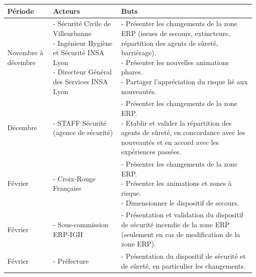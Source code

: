 \documentclass[hidelinks, paper=a4, fontsize=13pt]{report}
\begin{document}
\begin{center}
\begin{tabular}{| p{2cm} | p{5.5cm} | p{8cm} |}
\shrinkheight{1cm} 

  \hline
  \cellcolor[gray]{0.9} \textbf{Période} & \cellcolor[gray]{0.9} \textbf{Acteurs} & \cellcolor[gray]{0.9} \textbf{Buts} \\
  \hline
\vspace{0.1cm}
  Novembre à décembre & 
  \parbox[t]{5.5cm}{- Sécurité Civile de Villeurbanne\\
  - Ingénieur Hygiène et Sécurité INSA Lyon\\
  - Directeur Général des Services INSA Lyon} & 
  \parbox[t]{8cm}{- Présenter les changements de la zone ERP (issues de secours, extincteurs, répartition des agents de sûreté, barriérage).\\
  - Présenter les nouvelles animations phares.\\
  - Partager l'appréciation du risque lié aux nouveautés.}
\vspace{0.1cm}
 \\
 \hline
\vspace{0.1cm}
  Décembre &
  \parbox[t]{5.5cm}{- STAFF Sécurité (agence de sécurité)} & 
  \parbox[t]{8cm}{- Présenter les changements de la zone ERP.\\
  - Etablir et valider la répartition des agents de sûreté, en concordance avec les nouveautés et en accord avec les expériences passées.}
\vspace{0.1cm}
 \\
 \hline
\vspace{0.1cm}
  Février &
  \parbox[t]{5.5cm}{- Croix-Rouge Française} & 
  \parbox[t]{8cm}{- Présenter les changements de la zone ERP.\\
  - Présenter les animations et zones à risque.\\
  - Dimensionner le dispositif de secours.}
\vspace{0.1cm}
 \\
 \hline
\vspace{0.1cm}
  Février &
  \parbox[t]{5.5cm}{- Sous-commission ERP-IGH} & 
  \parbox[t]{8cm}{- Présentation et validation du dispositif de sécurité incendie de la zone ERP (seulement en cas de modification de la zone ERP).}
\vspace{0.1cm}
 \\
 \hline
\vspace{0.1cm}
  Février &
  \parbox[t]{5.5cm}{- Préfecture} & 
  \parbox[t]{8cm}{- Présentation du dispositif de sécurité et de sûreté, en particulier les changements.\\
}
\end{tabular}
\end{center}
\end{document}
